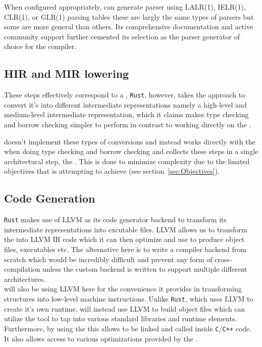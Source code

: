 When configured appropriately, \parserGen{} can generate parser using LALR(1), IELR(1), CLR(1), or GLR(1) parsing tables these are largly the
same types of parsers but some are more general than others. Its comprehensive
documentation and active community support further cemented its selection as the
parser generator of choice for the \lang{} compiler.

\subsection{HIR and MIR lowering}
\label{sec:hirmir}

These steps effectively correspond to a \static{}. \texttt{Rust}, however, takes the approach
to convert it's \ast{} into different intermediate representations namely a
high-level and medium-level intermediate representation, which it claims makes type
checking and borrow checking simpler to perform in contrast to working directly on
the \ast. 

\lang{} doesn't implement these types of conversions and instead works directly with
the \ast{} when doing type checking and borrow checking and collects these steps in a
single architectural step, the \static. This is done to minimize complexity due to
the limited objectives that \lang{} is attempting to achieve (see
section~\ref{sec:Objectives}).

\subsection{Code Generation}
\label{sec:codeGenTech}

\texttt{Rust} makes use of LLVM as its code generator backend to transform its intermediate
representations into excutable files. LLVM allows us to transform the \ast{} into
LLVM IR code which it can then optimize and use to produce object files, executables
etc. The alternative here is to write a compiler backend from scratch which would be
incredibly difficult and prevent any form of cross-compilation unless the custom
backend is written to support multiple different architectures. \\

\lang{} will also be using LLVM here for the convenience it provides in transforming
\ast{} structures into low-level machine instructions. Unlike \texttt{Rust}, which uses LLVM
to create it's own runtime, \lang{} will instead use LLVM to build object files which
can utilize the \gcc{} tool to tap into various standard libraries and
runtime elements. Furthermore, by using the \gcc{} this allows \lang{} to be linked and
called inside \texttt{C}/\texttt{C++} code. It also allows \lang{} access to various
optimizations provided by the \gcc.

\newpage
